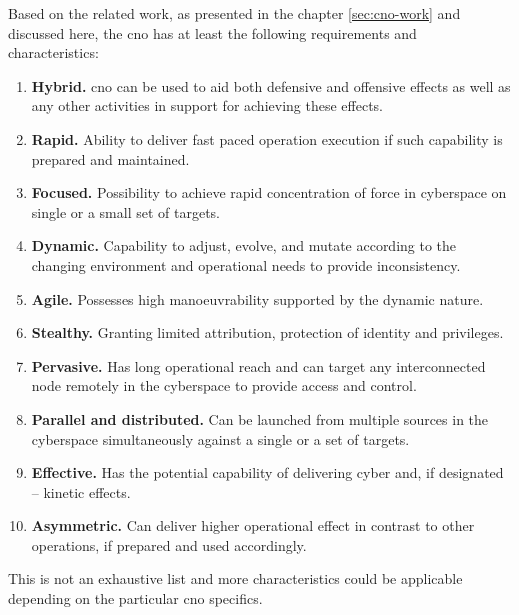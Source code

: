 Based on the related work, as presented in the chapter \ref{sec:cno-work} and discussed here, the \gls{cno} has at least the following requirements and characteristics:
\begin{enumerate}
    \item \textbf{Hybrid.} \gls{cno} can be used to aid both defensive and offensive effects as well as any other activities in support for achieving these effects.
    \item \textbf{Rapid.} Ability to deliver fast paced operation execution if such capability is prepared and maintained.
    \item \textbf{Focused.} Possibility to achieve rapid concentration of force in cyberspace on single or a small set of targets.
    \item \textbf{Dynamic.} Capability to adjust, evolve, and mutate according to the changing environment and operational needs to provide inconsistency.
    \item \textbf{Agile.} Possesses high manoeuvrability supported by the dynamic nature.
    \item \textbf{Stealthy.} Granting limited attribution, protection of identity and privileges.
    \item \textbf{Pervasive.} Has long operational reach and can target any interconnected node remotely in the cyberspace to provide access and control.
    \item \textbf{Parallel and distributed.} Can be launched from multiple sources in the cyberspace simultaneously against a single or a set of targets.
    \item \textbf{Effective.} Has the potential capability of delivering cyber and, if designated -- kinetic effects.
    \item \textbf{Asymmetric.} Can deliver higher operational effect in contrast to other operations, if prepared and used accordingly.
\end{enumerate}
This is not an exhaustive list and more characteristics could be applicable depending on the particular \gls{cno} specifics.
